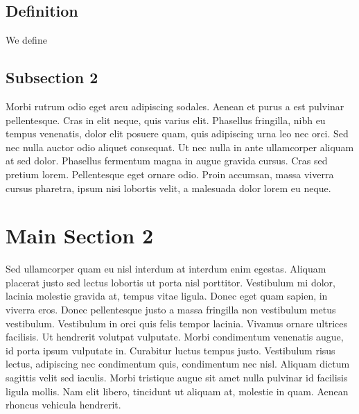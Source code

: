 \subsection{Definition}

We define


\subsection{Subsection 2}
Morbi rutrum odio eget arcu adipiscing sodales. Aenean et purus a est pulvinar pellentesque. Cras in elit neque, quis varius elit. Phasellus fringilla, nibh eu tempus venenatis, dolor elit posuere quam, quis adipiscing urna leo nec orci. Sed nec nulla auctor odio aliquet consequat. Ut nec nulla in ante ullamcorper aliquam at sed dolor. Phasellus fermentum magna in augue gravida cursus. Cras sed pretium lorem. Pellentesque eget ornare odio. Proin accumsan, massa viverra cursus pharetra, ipsum nisi lobortis velit, a malesuada dolor lorem eu neque.


\section{Main Section 2}

Sed ullamcorper quam eu nisl interdum at interdum enim egestas. Aliquam placerat justo sed lectus lobortis ut porta nisl porttitor. Vestibulum mi dolor, lacinia molestie gravida at, tempus vitae ligula. Donec eget quam sapien, in viverra eros. Donec pellentesque justo a massa fringilla non vestibulum metus vestibulum. Vestibulum in orci quis felis tempor lacinia. Vivamus ornare ultrices facilisis. Ut hendrerit volutpat vulputate. Morbi condimentum venenatis augue, id porta ipsum vulputate in. Curabitur luctus tempus justo. Vestibulum risus lectus, adipiscing nec condimentum quis, condimentum nec nisl. Aliquam dictum sagittis velit sed iaculis. Morbi tristique augue sit amet nulla pulvinar id facilisis ligula mollis. Nam elit libero, tincidunt ut aliquam at, molestie in quam. Aenean rhoncus vehicula hendrerit.
